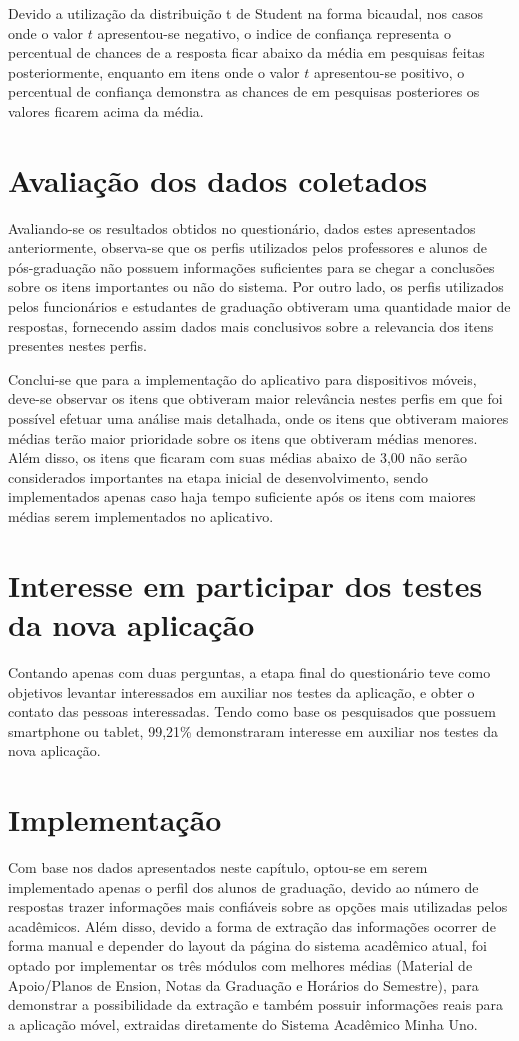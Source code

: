 Devido a utilização da  distribuição t de Student na forma bicaudal, nos casos onde o valor $t$ apresentou-se negativo, o indice de confiança representa o percentual de chances de a resposta ficar abaixo da média em pesquisas feitas posteriormente, enquanto em itens onde o valor $t$ apresentou-se positivo, o percentual de confiança demonstra as chances de em pesquisas posteriores os valores ficarem acima da média.

\section{Avaliação dos dados coletados}
Avaliando-se os resultados obtidos no questionário, dados estes apresentados anteriormente, observa-se que os perfis utilizados pelos professores e alunos de pós-graduação não possuem informações suficientes para se chegar a conclusões sobre os itens importantes ou não do sistema.
Por outro lado, os perfis utilizados pelos funcionários e estudantes de graduação obtiveram uma quantidade maior de respostas, fornecendo assim dados mais conclusivos sobre a relevancia dos itens presentes nestes perfis.

Conclui-se que para a implementação do aplicativo para dispositivos móveis, deve-se observar os itens que obtiveram maior relevância nestes perfis em que foi possível efetuar uma análise mais detalhada, onde os itens que obtiveram maiores médias terão maior prioridade sobre os itens que obtiveram médias menores. Além disso, os itens que ficaram com suas médias abaixo de 3,00 não serão considerados importantes na etapa inicial de desenvolvimento, sendo implementados apenas caso haja tempo suficiente após os itens com maiores médias serem implementados no aplicativo.

\section{Interesse em participar dos testes da nova aplicação}
Contando apenas com duas perguntas, a etapa final do questionário teve como objetivos levantar interessados em auxiliar nos testes da aplicação, e obter o contato das pessoas interessadas. Tendo como base os pesquisados que possuem smartphone ou tablet, 99,21\% demonstraram interesse em auxiliar nos testes da nova aplicação.

\section{Implementação}
Com base nos dados apresentados neste capítulo, optou-se em serem implementado apenas o perfil dos alunos de graduação, devido ao número de respostas trazer informações mais confiáveis sobre as opções mais utilizadas pelos acadêmicos. Além disso, devido a forma de extração das informações ocorrer de forma manual e depender do layout da página do sistema acadêmico atual, foi optado por implementar os três módulos com melhores médias (Material de Apoio/Planos de Ension, Notas da Graduação e Horários do Semestre), para demonstrar a possibilidade da extração e também possuir informações reais para a aplicação móvel, extraidas diretamente do Sistema Acadêmico Minha Uno.
